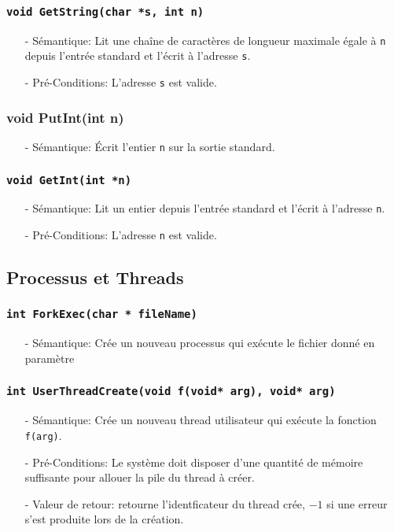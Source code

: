 \documentclass[11pt]{article}
\begin{document}
\subsubsection{\texttt{void GetString(char *s, int n)}}
\begin{itemize}
\item[-] Sémantique:
  Lit une chaîne de caractères de longueur maximale égale à \texttt{n} depuis l'entrée standard et
  l'écrit à l'adresse \texttt{s}.
\item[-] Pré-Conditions: L'adresse \texttt{s} est valide.
\end{itemize}

\subsubsection{void PutInt(int n)}
\begin{itemize}
\item[-] Sémantique: Écrit l'entier \texttt{n} sur la sortie standard.
\end{itemize}

\subsubsection{\texttt{void GetInt(int *n)}}
\begin{itemize}
\item[-] Sémantique: Lit un entier depuis l'entrée standard et l'écrit à l'adresse \texttt{n}.
\item[-] Pré-Conditions: L'adresse \texttt{n} est valide.
\end{itemize}

\subsection{Processus et Threads}

\subsubsection{\texttt{int ForkExec(char * fileName)}}
 \begin{itemize}
 \item[-] Sémantique: Crée un nouveau processus qui exécute le fichier donné en paramètre
 \end{itemize}

\subsubsection{\texttt{int UserThreadCreate(void f(void* arg), void* arg)}}
\begin{itemize}
\item[-] Sémantique: Crée un nouveau thread utilisateur qui exécute la fonction \texttt{f(arg)}.
\item[-] Pré-Conditions: Le système doit disposer d'une quantité de mémoire suffisante pour allouer la
  pile du thread à créer. 
\item[-] Valeur de retour: retourne l'identficateur du thread crée, $-1$ si une erreur s'est produite lors de
  la création.
\end{itemize}
\end{document}
